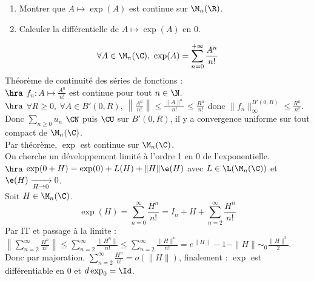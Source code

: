 \documentclass[11pt]{article}
\begin{document}
\begin{exercice}{}{}
    \begin{enumerate}
        \item Montrer que $A\mapsto\exp(A)$ est continue sur $\M_n(\R)$.
        \item Calculer la différentielle de $A\mapsto \exp(A)$ en 0.
    \end{enumerate}
    \tcblower
    \begin{equation*}
        \forall A \in \M_n(\C), ~ \exp(A) = \sum_{n=0}^{+\infty}\frac{A^n}{n!}
    \end{equation*}
    Théorème de continuité des séries de fonctions :\\
    $\hra$ $f_n:A\mapsto \frac{A^n}{n!}$ est continue pour tout $n\in\N$.\\
    $\hra$ $\forall R \geq 0, ~ \forall A \in B'(0,R), ~ \left\|\frac{A^n}{n!}\right\|\leq \frac{\|A\|^n}{n!} \leq \frac{R^n}{n!}$ donc $\|f_n\|_{\infty}^{B'(0,R)}\leq\frac{R^n}{n!}$.\\
    Donc $\sum_{n\geq0}u_n$ $\CN$ puis $\CU$ sur $B'(0,R)$, il y a convergence uniforme sur tout compact de $\M_n(\C)$.\\
    Par théorème, $\exp$ est continue sur $\M_n(\C)$.\\
     On cherche un développement limité à l'ordre 1 en 0 de l'exponentielle.\\
    $\hra$ $\exp(0+H)=\exp(0) + L(H) + \|H\|\e(H)$ avec $L\in\L(\M_n(\C))$ et $\e(H)\xrightarrow[H\to0]{}0$.\\
    Soit $H\in\M_n(\C)$. 
    \begin{equation*}
        \exp(H) = \sum_{n=0}^\infty\frac{H^n}{n!} = I_n + H + \sum_{n=2}^{\infty} \frac{H^n}{n!}
    \end{equation*}
    Par IT et passage à la limite : $\left\|\sum_{n=2}^\infty\frac{H^n}{n!}\right\|\leq\sum_{n=2}^{\infty}\frac{\|H^n\|}{n!}\leq\sum_{n=2}^\infty\frac{\|H\|^n}{n!}=e^{\|H\|}-1-\|H\| \sim_0 \frac{\|H\|^2}{2}$.\\
    Donc par majoration, $\sum_{n=2}^\infty\frac{H^n}{n!}=o(\|H\|)$, finalement : $\exp$ est différentiable en 0 et $d\exp_0=\Id$.
\end{exercice}
\end{document}
